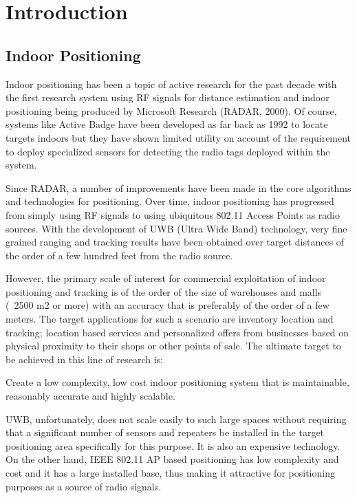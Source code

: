 \chapter{Introduction}

\section{Indoor Positioning}

Indoor positioning has been a topic of active research for the past decade with the first research system using RF signals for distance estimation and indoor positioning being produced by Microsoft Research (RADAR, 2000)\cite{RADAR}. Of course, systems like Active Badge  have been developed as far back as 1992 to locate targets indoors but they have shown limited utility on account of the requirement to deploy specialized sensors for detecting the radio tags deployed within the system.

Since RADAR, a number of improvements have been made in the core algorithms and technologies for positioning. Over time, indoor positioning has progressed from simply using RF signals to using ubiquitous 802.11 Access Points as radio sources. With the development of UWB (Ultra Wide Band) technology, very fine grained ranging and tracking results have been obtained over target distances of the order of a few hundred feet from the radio source. 

However, the primary scale of interest for commercial exploitation of indoor positioning and tracking is of the order of the size of warehouses and malls (~2500 m2 or more) with an accuracy that is preferably of the order of a few meters. The target applications for such a scenario are inventory location and tracking; location based services and personalized offers from businesses based on physical proximity to their shops or other points of sale. The ultimate target to be achieved in this line of research is:

Create a low complexity, low cost indoor positioning system that is maintainable, reasonably accurate and highly scalable.

UWB, unfortunately, does not scale easily to such large spaces without requiring that a significant number of sensors and repeaters be installed in the target positioning area specifically for this purpose. It is also an expensive technology. On the other hand, IEEE 802.11 AP based positioning has low complexity and cost and it has a large installed base, thus making it attractive for positioning purposes as a source of radio signals.

